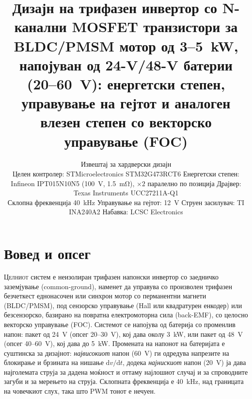 \documentclass[journal,onecolumn,11pt]{IEEEtran}
\renewcommand{\IEEEPARstart}[2]{\lettrine[lines=2,findent=2pt,nindent=0pt]{#1}{#2}}
\begin{document}
\title{Дизајн на трифазен инвертор со N-канални MOSFET транзистори за
\mbox{BLDC/PMSM} мотор од \mbox{3--\SI{5}{\kilo\watt}}, напојуван од
\mbox{24-V/48-V} батерии (\mbox{20--\SI{60}{\volt}}): енергетски степен,
управување на гејтот и аналоген влезен степен со векторско управување (FOC)}

\author{Извештај за хардверски дизајн\\
\small Целен контролер: STMicroelectronics STM32G473RCT6 \quad
Енергетски степен: Infineon IPT015N10N5 (\SI{100}{\volt}, \SI{1.5}{\milli\ohm}),
$\times 2$ паралелно по позиција \quad Драјвер: Texas Instruments UCC27211A-Q1\\
\small Склопна фреквенција \SI{40}{\kilo\hertz} \quad Управување на гејтот:
\SI{12}{\volt} \quad Струен засилувач: TI INA240A2 \quad Набавка: LCSC Electronics}

\maketitle

\section{Вовед и опсег}
\IEEEPARstart{Ц}{елниот} систем е неизолиран трифазен напонски инвертор со
заедничко заземјување (common-ground), наменет да управува со произволен трифазен
безчеткест еднонасочен или синхрон мотор со перманентни магнети (BLDC/PMSM), под
сензорско управување (Hall или квадратурен енкодер) или безсензорско, базирано на
повратна електромоторна сила (back-EMF), со целосно векторско управување (FOC).
Системот се напојува од батерија со променлив напон: пакет од \SI{24}{\volt}
(опсег \mbox{20--\SI{30}{\volt}}), кој дава околу \SI{3}{\kilo\watt}, или пакет од
\SI{48}{\volt} (опсег \mbox{40--\SI{60}{\volt}}), кој дава до \SI{5}{\kilo\watt}.
Промената на напонот на батеријата е суштинска за дизајнот: \emph{највисокиот}
напон (\SI{60}{\volt}) ги одредува напрезите на блокирање и брзината на нишање
$\mathrm{d}v/\mathrm{d}t$, додека \emph{најнискиот} напон (\SI{20}{\volt}) ја дава
најголемата струја за дадена моќност и оттаму најлошиот случај и за спроводните
загуби и за мерењето на струја. Склопната фреквенција е \SI{40}{\kilo\hertz}, над
границата на човечкиот слух, така што PWM тонот е нечуен.
\end{document}
